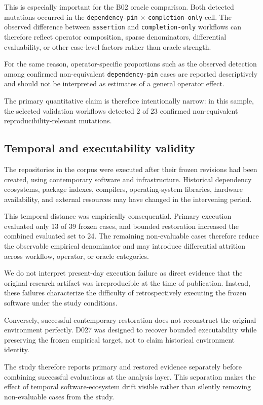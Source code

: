 This is especially important for the B02 oracle comparison. Both detected
mutations occurred in the
\texttt{dependency-pin} $\times$ \texttt{completion-only} cell. The observed
difference between \texttt{assertion} and \texttt{completion-only} workflows
can therefore reflect operator composition, sparse denominators, differential
evaluability, or other case-level factors rather than oracle strength.

For the same reason, operator-specific proportions such as the observed
detection among confirmed non-equivalent \texttt{dependency-pin} cases are
reported descriptively and should not be interpreted as estimates of a general
operator effect.

The primary quantitative claim is therefore intentionally narrow: in this
sample, the selected validation workflows detected 2 of 23 confirmed
non-equivalent reproducibility-relevant mutations.


\subsection{Temporal and executability validity}
\label{sec:threats-temporal}

The repositories in the corpus were executed after their frozen revisions had
been created, using contemporary software and infrastructure. Historical
dependency ecosystems, package indexes, compilers, operating-system libraries,
hardware availability, and external resources may have changed in the
intervening period.

This temporal distance was empirically consequential. Primary execution
evaluated only 13 of 39 frozen cases, and bounded restoration increased the
combined evaluated set to 24. The remaining non-evaluable cases therefore
reduce the observable empirical denominator and may introduce differential
attrition across workflow, operator, or oracle categories.

We do not interpret present-day execution failure as direct evidence that the
original research artifact was irreproducible at the time of publication.
Instead, these failures characterize the difficulty of retrospectively
executing the frozen software under the study conditions.

Conversely, successful contemporary restoration does not reconstruct the
original environment perfectly. D027 was designed to recover bounded
executability while preserving the frozen empirical target, not to claim
historical environment identity.

The study therefore reports primary and restored evidence separately before
combining successful evaluations at the analysis layer. This separation makes
the effect of temporal software-ecosystem drift visible rather than silently
removing non-evaluable cases from the study.

